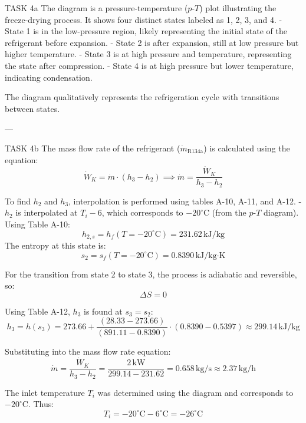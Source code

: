 TASK 4a  
The diagram is a pressure-temperature (\(p\)-\(T\)) plot illustrating the freeze-drying process. It shows four distinct states labeled as 1, 2, 3, and 4.  
- State 1 is in the low-pressure region, likely representing the initial state of the refrigerant before expansion.  
- State 2 is after expansion, still at low pressure but higher temperature.  
- State 3 is at high pressure and temperature, representing the state after compression.  
- State 4 is at high pressure but lower temperature, indicating condensation.  

The diagram qualitatively represents the refrigeration cycle with transitions between states.

---

TASK 4b  
The mass flow rate of the refrigerant (\(\dot{m}_{\text{R134a}}\)) is calculated using the equation:  
\[
\dot{W}_K = \dot{m} \cdot (h_3 - h_2) \implies \dot{m} = \frac{\dot{W}_K}{h_3 - h_2}
\]  

To find \(h_2\) and \(h_3\), interpolation is performed using tables A-10, A-11, and A-12.  
- \(h_2\) is interpolated at \(T_i - 6\), which corresponds to \(-20^\circ\text{C}\) (from the \(p\)-\(T\) diagram). Using Table A-10:  
\[
h_{2,s} = h_f(T = -20^\circ\text{C}) = 231.62 \, \text{kJ/kg}
\]  
The entropy at this state is:  
\[
s_2 = s_f(T = -20^\circ\text{C}) = 0.8390 \, \text{kJ/kg·K}
\]  

For the transition from state 2 to state 3, the process is adiabatic and reversible, so:  
\[
\Delta S = 0
\]  

Using Table A-12, \(h_3\) is found at \(s_3 = s_2\):  
\[
h_3 = h(s_3) = 273.66 + \frac{(28.33 - 273.66)}{(891.11 - 0.8390)} \cdot (0.8390 - 0.5397) \approx 299.14 \, \text{kJ/kg}
\]  

Substituting into the mass flow rate equation:  
\[
\dot{m} = \frac{\dot{W}_K}{h_3 - h_2} = \frac{2 \, \text{kW}}{299.14 - 231.62} = 0.658 \, \text{kg/s} \approx 2.37 \, \text{kg/h}
\]  

The inlet temperature \(T_i\) was determined using the diagram and corresponds to \(-20^\circ\text{C}\). Thus:  
\[
T_i = -20^\circ\text{C} - 6^\circ\text{C} = -26^\circ\text{C}
\]